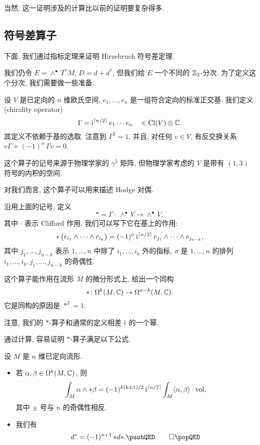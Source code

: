 当然, 这一证明涉及的计算比以前的证明要复杂得多.


\subsection{符号差算子}

下面, 我们通过指标定理来证明 Hirzebruch 符号差定理.

我们仍令 $E = \wedge^\bullet \, T^* M$, $D = d + d^*$,
但我们给 $E$ 一个不同的 $\mathbb{Z}_2$-分次.
为了定义这个分次, 我们需要做一些准备.

\begin{definition}
    设 $V$ 是已定向的 $n$ 维欧氏空间, $e_1, \dotsc, e_n$ 是一组符合定向的标准正交基.
    我们定义 (chirality operator)
    \[ \Gamma = \mathrm{i}^{\lceil n/2 \rceil} \, e_1 \cdots e_n 
        \quad \in \operatorname{Cl} (V) \otimes \mathbb{C}. \]
    其定义不依赖于基的选取. 注意到 $\Gamma^2 = 1$, 并且,
    对任何 $v \in V$, 有反交换关系 $v \Gamma + (-1)^n \, \Gamma v = 0$.
\end{definition}

这个算子的记号来源于物理学家的 $\gamma^5$ 矩阵,
但物理学家考虑的 $V$ 是带有 $(1, 3)$ 符号的内积的空间.

对我们而言, 这个算子可以用来描述 Hodge 对偶.

\begin{definition}
    沿用上面的记号, 定义 
    \[ {*} = \Gamma \cdot {} \: {\wedge^\bullet \, V} \to \wedge^\bullet \, V, \]
    其中 $\cdot$ 表示 Clifford 作用. 我们可以写下它在基上的作用:
    \[ {*} \, \bigl( e_{i_1} \wedge \cdots \wedge e_{i_k} \bigr)
        = (-1)^\sigma \, \mathrm{i}^{\lceil n/2 \rceil} \,
        e_{j_1} \wedge \cdots \wedge e_{j_{n-k}}, \]
    其中 $j_1, \dotsc, j_{n-k}$ 表示 $1, \dotsc, n$ 中除了 $i_1, \dotsc, i_k$ 外的指标,
    $\sigma$ 是 $1, \dotsc, n$ 的排列 $i_1, \dotsc, i_k, j_1, \dotsc, j_{n-k}$ 的奇偶性.
    
    这个算子能作用在流形 $M$ 的微分形式上, 给出一个同构
    \[ {*} \colon \Omega^k (M, \mathbb{C}) \to \Omega^{n-k} (M, \mathbb{C}). \]
    它是同构的原因是 ${*}^2 = 1$.
\end{definition}

注意, 我们的 $*$-算子和通常的定义相差 $\mathrm{i}$ 的一个幂.

通过计算, 容易证明 $*$-算子满足以下公式.

\begin{lemma}
    设 $M$ 是 $n$ 维已定向流形.
    \begin{itemize}
        \item 
            若 $\alpha, \beta \in \Omega^k (M, \mathbb{C})$, 则
            \[ \int_M \alpha \wedge {*}\beta =
                (-1)^{k (k \pm 1) / 2} \, \mathrm{i}^{\lceil n/2 \rceil}
                \int_M \langle \alpha, \beta \rangle \cdot \mathrm{vol}, \]
            其中 $\pm$ 号与 $n$ 的奇偶性相反.
        \item
            我们有 
            \[ d^* = (-1)^{n+1} \, {*} d {*}. \thmqedhere \]
    \end{itemize}
\end{lemma}

